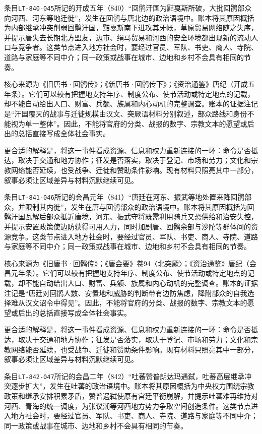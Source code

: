 条目\texttt{LT-840-045}所记的开成五年（840）“回鹘汗国为黠戛斯所破，大批回鹘部众向河西、河东等地迁徙”，发生在回鹘与唐北边的政治语境中。账本将其原因概括为内部继承冲突削弱回鹘汗国，黠戛斯南下进攻其牙帐，草原贸易网络随之失序，并提示唐失去长期北方盟友，边市、绢马贸易和河西的安全环境都出现新的流动人口与竞争者。这类节点进入地方社会时，要经过官员、军队、书吏、商人、寺院、道路与家庭等不同中介；同一政策或战事在城市、边地和乡村不会具有相同的节奏。

核心来源为《旧唐书·回鹘传》；《新唐书·回鹘传下》；《资治通鉴》唐纪（开成五年条）。它们可以较有把握地支持年序、制度公布、使节活动或特定地点的记载，却不能自动给出人口、财富、兵额、族属和内心动机的完整调查。账本的证据注记是“汗国覆灭的战事与迁徙规模由汉文、突厥语材料分别叙述，部众路线和身份不能视为单一整体”。因此，不能将官府的分类、战报的数字、宗教文本的愿望或后出的总括直接写成全体社会事实。

更合适的解释是，将这一事件看成资源、信息和权力重新连接的一环：命令是否抵达，取决于交通和地方协作；征发是否落实，取决于登记、市场和劳力；文化和宗教网络能否延续，也受战争、迁徙和赞助条件影响。现有材料只照亮其中一部分，叙事必须让区域差异与材料沉默继续可见。

条目\texttt{LT-841-046}所记的会昌元年（841）“唐廷在河东、振武等地处置来降回鹘部众，并限制其内徙”，发生在唐与回鹘部众的政治语境中。账本将其原因概括为回鹘汗国瓦解后部众抵近唐境，河东、振武守将既需利用骑兵又恐供给和治安失控，并提示安置政策使边防获得可用人力，同时加剧唐、回鹘余部与沙陀等群体间的资源竞争。这类节点进入地方社会时，要经过官员、军队、书吏、商人、寺院、道路与家庭等不同中介；同一政策或战事在城市、边地和乡村不会具有相同的节奏。

核心来源为《旧唐书·回鹘传》；《唐会要》卷94〈北突厥〉；《资治通鉴》唐纪（会昌元年条）。它们可以较有把握地支持年序、制度公布、使节活动或特定地点的记载，却不能自动给出人口、财富、兵额、族属和内心动机的完整调查。账本的证据注记是“唐廷对回鹘人数、安置地和威胁的判断带有边防焦虑，降附部众的自我选择难从汉文诏令中得见”。因此，不能将官府的分类、战报的数字、宗教文本的愿望或后出的总括直接写成全体社会事实。

更合适的解释是，将这一事件看成资源、信息和权力重新连接的一环：命令是否抵达，取决于交通和地方协作；征发是否落实，取决于登记、市场和劳力；文化和宗教网络能否延续，也受战争、迁徙和赞助条件影响。现有材料只照亮其中一部分，叙事必须让区域差异与材料沉默继续可见。

条目\texttt{LT-842-047}所记的会昌二年（842）“吐蕃赞普朗达玛遇弑，吐蕃高层继承冲突逐步扩大”，发生在吐蕃的政治语境中。账本将其原因概括为中央权力围绕宗教政策和继承安排积累矛盾，赞普遇弑使原有宫廷平衡崩解，并提示吐蕃难再维持对河西、青海的统一调度，为张议潮等河西地方势力争取空间创造条件。这类节点进入地方社会时，要经过官员、军队、书吏、商人、寺院、道路与家庭等不同中介；同一政策或战事在城市、边地和乡村不会具有相同的节奏。

